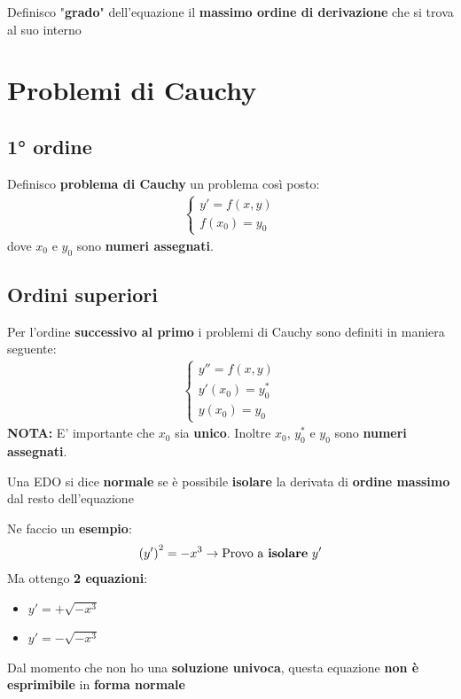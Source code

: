 \documentclass[a4paper, oneside]{article}
\begin{document}
    \begin{definition}
        Definisco "\textbf{grado}" dell'equazione il \textbf{massimo ordine di derivazione} che si trova al suo interno
    \end{definition}

    \section{Problemi di Cauchy}
    \subsection{1° ordine}
    Definisco \textbf{problema di Cauchy} un problema così posto: 
    \begin{gather*}
        \begin{cases}
            y'=f(x,y) \\
            f(x_0)=y_0
        \end{cases}
    \end{gather*}
    dove $x_0$ e $y_0$ sono \textbf{numeri assegnati}.

    \subsection{Ordini superiori}
    Per l'ordine \textbf{successivo al primo} i problemi di Cauchy sono definiti in maniera seguente:
    \begin{gather*}
        \begin{cases}
            y''=f(x,y) \\
            y'(x_0)=y^* _0 \\
            y(x_0) = y_0
        \end{cases}
    \end{gather*}
    \textbf{NOTA:} E' importante che $x_0$ sia \textbf{unico}. Inoltre $x_0$, $y^*_0$ e $y_0$ sono \textbf{numeri assegnati}.

    \begin{definition}
        Una EDO si dice \textbf{normale} se è possibile \textbf{isolare} la derivata di \textbf{ordine massimo} dal resto dell'equazione
    \end{definition}
    Ne faccio un \textbf{esempio}:
    \begin{gather*}
            \left(y'\right)^2=-x^3 \rightarrow \text{Provo a \textbf{isolare}} \ y' \\
    \end{gather*}
    Ma ottengo \textbf{2 equazioni}:
    \begin{itemize}
        \item $y'=+\sqrt{-x^3}$
        \item $y'=-\sqrt{-x^3}$
    \end{itemize}
    Dal momento che non ho una \textbf{soluzione univoca}, questa equazione \textbf{non è esprimibile} in \textbf{forma normale}
\end{document}
